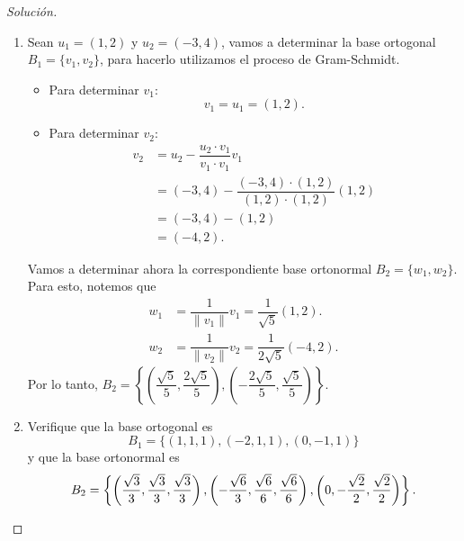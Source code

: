 \documentclass[a4,11pt]{aleph-notas}
\begin{document}
\begin{proof}[Solución]\hspace{0pt}
    \begin{enumerate}
    \item Sean $u_{1} = (1, 2)$ y $u_{2} = (-3, 4)$, vamos a determinar la base ortogonal $B_{1}=\{v_{1}, v_{2}\}$, para hacerlo utilizamos el proceso de Gram-Schmidt.
    \begin{itemize}
        \item Para determinar $v_{1}$: 
        \[
            v_{1} = u_{1} = (1, 2).
        \]
        \item Para determinar $v_{2}$:
        \begin{align*}
            v_{2} &= u_{2} - \dfrac{u_{2} \cdot v_{1}}{v_{1} \cdot v_{1}}v_{1}\\
                  &= (-3, 4) - \dfrac{(-3, 4) \cdot (1, 2)}{(1, 2) \cdot (1, 2)}(1, 2)\\
                  &= (-3, 4) - (1, 2)\\
                  &= (-4, 2).
        \end{align*}
    \end{itemize}
    Vamos a determinar ahora la correspondiente base ortonormal $B_{2}=\{w_{1}, w_{2}\}$. Para esto, notemos que
    \begin{align*}
        w_{1} &= \dfrac{1}{\|v_{1}\|}v_{1} = \dfrac{1}{\sqrt{5}}(1, 2).\\
        w_{2} &= \dfrac{1}{\|v_{2}\|}v_{2} = \dfrac{1}{2\sqrt{5}}(-4, 2).
    \end{align*}
    Por lo tanto, $B_{2}=\left\{\left(\dfrac{\sqrt{5}}{5}, \dfrac{2\sqrt{5}}{5}\right), \left(-\dfrac{2\sqrt{5}}{5}, \dfrac{\sqrt{5}}{5}\right)\right\}$.
    \item Verifique que la base ortogonal es
    \[
        B_{1} = \{(1, 1, 1), (-2, 1, 1), (0, -1, 1)\}
    \]
    y que la base ortonormal es
    \[
        B_{2} = \left\{\left(\dfrac{\sqrt{3}}{3}, \dfrac{\sqrt{3}}{3}, \dfrac{\sqrt{3}}{3}\right), \left(-\dfrac{\sqrt{6}}{3}, \dfrac{\sqrt{6}}{6}, \dfrac{\sqrt{6}}{6}\right), \left(0, -\dfrac{\sqrt{2}}{2}, \dfrac{\sqrt{2}}{2}\right)\right\}. \qedhere
    \]
\end{enumerate}
\end{proof}
\end{document}
